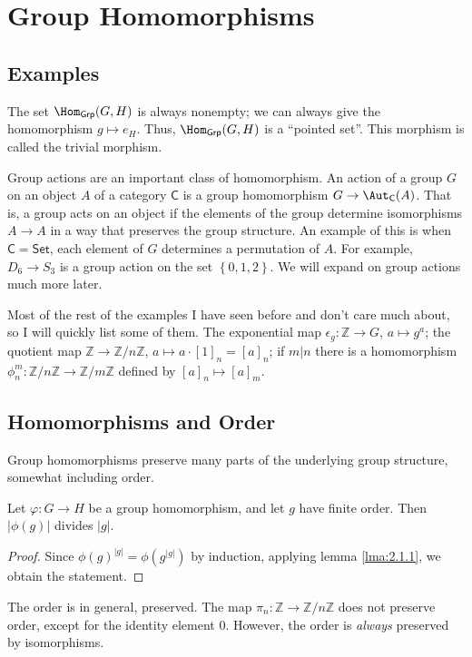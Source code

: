 \section{Group Homomorphisms}
\subsection{Examples}

The set $\Hom_{\mathsf{Grp}}(G , H) $ is always nonempty; we can always give the homomorphism $g\mapsto e_H$. Thus, $\Hom_{\mathsf{Grp}}(G , H) $ is a ``pointed set''. This morphism is called the trivial morphism.

Group actions are an important class of homomorphism. An action of a group $G$ on an object $A$ of a category $\mathsf{C}$ is a group homomorphism $G\to \Aut_{\mathsf{C}}( A ) $. That is, a group acts on an object if the elements of the group determine isomorphisms $A\to A$ in a way that preserves the group structure. An example of this is when $\mathsf{C}=\mathsf{Set}$, each element of $G$ determines a permutation of $A$. For example, $D_6\to S_3$ is a group action on the set $\left\{ 0,1,2 \right\} $. We will expand on group actions much more later.

Most of the rest of the examples I have seen before and don't care much about,  so I will quickly list some of them. The exponential map $\epsilon_g : \mathbb{Z} \to G$, $a\mapsto g^a$; the quotient map $\mathbb{Z}\to \mathbb{Z}/n\mathbb{Z}$, $a\mapsto a\cdot [1]_n=[a]_n$; if $m|n$ there is a homomorphism $\phi_n^m : \mathbb{Z}/n\mathbb{Z} \to \mathbb{Z}/m\mathbb{Z}$ defined by $[a]_n\mapsto [a]_m$.

\subsection{Homomorphisms and Order}
Group homomorphisms preserve many parts of the underlying group structure, somewhat including order.
\begin{proposition}\label{prp:2.4.1}
	Let $\varphi : G \to H$ be a group homomorphism, and let $g$ have finite order. Then $\left| \phi (g) \right| $ divides $\left| g \right| $.
\end{proposition}
\begin{proof}
	Since $\phi (g)^{\left| g \right|}=\phi \left( g^{\left| g \right| } \right)  $ by induction, applying lemma \ref{lma:2.1.1}, we obtain the statement.
\end{proof}
The order is in general, preserved. The map $\pi_n : \mathbb{Z} \to \mathbb{Z}/n\mathbb{Z}$ does not preserve order, except for the identity element $0$. However, the order is \emph{always} preserved by isomorphisms.

